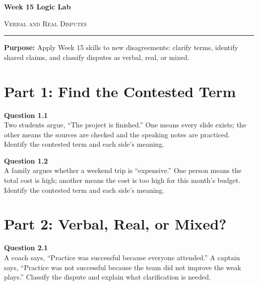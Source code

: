 \documentclass[12pt]{article}
\begin{document}
\begin{center}
{\LARGE\bfseries Week 15 Logic Lab}\par\vspace{0.05em}
{\large\scshape Verbal and Real Disputes}\par\vspace{0.1em}
\rule{0.78\textwidth}{0.5pt}\par\vspace{0.15em}
\end{center}

\noindent\textbf{Purpose:} Apply Week 15 skills to new disagreements: clarify terms, identify shared claims, and classify disputes as verbal, real, or mixed.

\vspace{0.3em}

\section*{Part 1: Find the Contested Term}

\textbf{Question 1.1}\\[-0.15em]
Two students argue, ``The project is finished.'' One means every slide exists; the other means the sources are checked and the speaking notes are practiced. Identify the contested term and each side's meaning.


\textbf{Question 1.2}\\[-0.15em]
A family argues whether a weekend trip is ``expensive.'' One person means the total cost is high; another means the cost is too high for this month's budget. Identify the contested term and each side's meaning.


\newpage

\section*{Part 2: Verbal, Real, or Mixed?}

\textbf{Question 2.1}\\[-0.15em]
A coach says, ``Practice was successful because everyone attended.'' A captain says, ``Practice was not successful because the team did not improve the weak plays.'' Classify the dispute and explain what clarification is needed.

\end{document}
